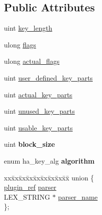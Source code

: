\subsection*{Public Attributes}
\begin{DoxyCompactItemize}
\item 
uint \mbox{\hyperlink{structst__key_a1d13519288addbb6c0d1bba3c6f44968}{key\+\_\+length}}
\item 
ulong \mbox{\hyperlink{structst__key_ae731249c40a20dc905cea7be9864ab39}{flags}}
\item 
ulong \mbox{\hyperlink{structst__key_ac21c3d5f4fe81d2a398c1ed80c755516}{actual\+\_\+flags}}
\item 
uint \mbox{\hyperlink{structst__key_abd3126670f8060d4d3c29a1637836ac3}{user\+\_\+defined\+\_\+key\+\_\+parts}}
\item 
uint \mbox{\hyperlink{structst__key_ae6e21b5421c8c6f5a53fc5ec3dbeea80}{actual\+\_\+key\+\_\+parts}}
\item 
uint \mbox{\hyperlink{structst__key_a752659925a2775974f1e6c7c558c1cbc}{unused\+\_\+key\+\_\+parts}}
\item 
uint \mbox{\hyperlink{structst__key_ac733c94b20da4e1547c0845b482d4a7a}{usable\+\_\+key\+\_\+parts}}
\item 
\mbox{\label{structst__key_a88481206c13b4c027ca7cc2e681e8770}} 
uint {\bfseries block\+\_\+size}
\item 
\mbox{\label{structst__key_aa24116ccb4248bdf7f0d88c992cb3ea2}} 
enum ha\+\_\+key\+\_\+alg {\bfseries algorithm}
\item 
\begin{tabbing}
xx\=xx\=xx\=xx\=xx\=xx\=xx\=xx\=xx\=\kill
union \{\\
\>\mbox{\hyperlink{structst__plugin__int}{plugin\_ref}} \mbox{\hyperlink{structst__key_a8e1a4faaf158f6e15d49873be131d4b8}{parser}}\\
\>LEX\_STRING $\ast$ \mbox{\hyperlink{structst__key_a3afb9443467034d75bd1cb838b3a77c0}{parser\_name}}\\
\}; \\


\end{tabbing}
\end{DoxyCompactItemize}
